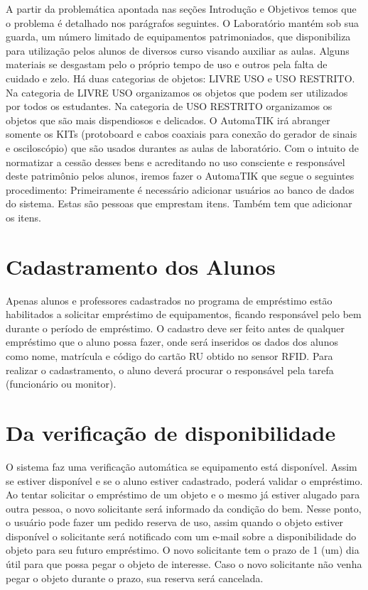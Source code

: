 \vspace{-42pt}
A partir da problemática apontada nas seções Introdução e Objetivos temos que o problema é detalhado nos parágrafos seguintes. 
O Laboratório mantém sob sua guarda, um número limitado de equipamentos patrimoniados, que disponibiliza para utilização pelos alunos de diversos curso visando auxiliar as aulas. 
Alguns materiais se desgastam pelo o próprio tempo de uso e outros pela falta de cuidado e zelo. Há duas categorias de objetos: LIVRE USO e USO RESTRITO. Na categoria de LIVRE USO organizamos os objetos que podem ser utilizados por todos os estudantes. Na categoria de USO RESTRITO organizamos os objetos que são mais dispendiosos e delicados. O AutomaTIK irá abranger somente os KITs (protoboard e cabos coaxiais para conexão do gerador de sinais e osciloscópio) que são usados durantes as aulas de laboratório. 
Com o intuito de normatizar a cessão desses bens e acreditando no uso consciente e responsável deste patrimônio pelos alunos, iremos fazer o AutomaTIK que segue o seguintes procedimento:
Primeiramente é necessário adicionar usuários ao banco de dados do sistema. Estas são pessoas que emprestam itens. Também tem que adicionar os itens.

\section[Cadastramento dos Alunos]{Cadastramento dos Alunos}  
Apenas alunos e professores cadastrados no programa de empréstimo estão habilitados a solicitar empréstimo de equipamentos, ficando responsável pelo bem durante o período de empréstimo. O cadastro deve ser feito antes de qualquer empréstimo que o aluno possa fazer, onde será inseridos os dados dos alunos como nome, matrícula e código do cartão RU obtido no sensor RFID. Para realizar o cadastramento, o aluno deverá procurar o responsável pela tarefa (funcionário ou monitor).
\section[Da verificação de disponibilidade]{Da verificação de disponibilidade}  
O sistema faz uma verificação automática se equipamento está disponível. Assim se estiver disponível e se o aluno estiver cadastrado, poderá validar o empréstimo. 
Ao tentar solicitar o empréstimo de um objeto e o mesmo já estiver alugado para outra pessoa, o novo solicitante será informado da condição do bem. Nesse ponto, o usuário pode fazer um pedido reserva de uso, assim quando o objeto estiver disponível o solicitante será notificado com um e-mail sobre a disponibilidade do objeto para seu futuro empréstimo. O novo solicitante tem o prazo de 1 (um) dia útil para que possa pegar o objeto de interesse. Caso o novo solicitante não venha pegar o objeto durante o prazo, sua reserva será cancelada.
